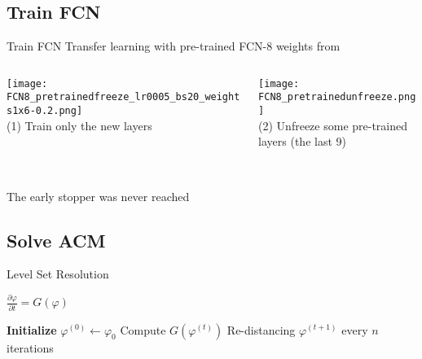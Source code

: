 \subsection{Train FCN}
\begin{frame}{Train FCN}
    Transfer learning with pre-trained FCN-8 weights from \citeauthor*{long_fully_2015}
    \begin{columns}
        \begin{column}{0.5\textwidth}
            \centering
            \texttt{[image: FCN8\_pretrainedfreeze\_lr0005\_bs20\_weights1x6-0.2.png]} \\ 
            (1) Train only the new layers \\
            \tiny{}
        \end{column}

        \begin{column}{.5\textwidth}
            \centering
            \texttt{[image: FCN8\_pretrainedunfreeze.png]} \\ 
            (2) Unfreeze some pre-trained layers {\tiny(the last 9)} \\
            \tiny{}
        \end{column}
    \end{columns}
    \vfill
     \\ 
    The early stopper was never reached
\end{frame}

\subsection{Solve ACM}
\begin{frame}{Level Set Resolution}

 $\frac{\partial \varphi}{\partial t} = G(\varphi) $
    \begin{algorithm}[H]
        \caption{Level Set Method}
        \begin{algorithmic}
            \Input 
             
            \EndInput
            \State \textbf{Initialize} $\varphi^{(0)} \gets \varphi_0$
                \State Compute $G(\varphi^{(t)})$
                \State {} 
                \State Re-distancing $\varphi^{(t+1)}$ every $n$ iterations  %
            \EndFor
        \end{algorithmic}
    \end{algorithm}
\end{frame}

